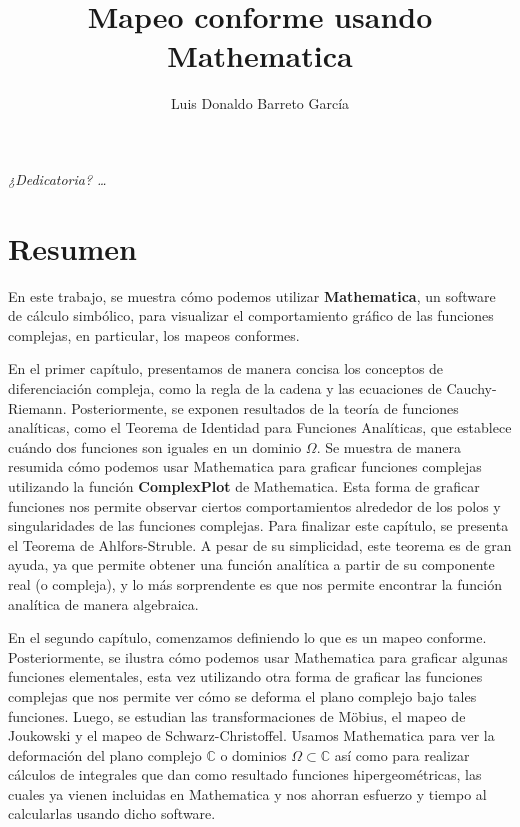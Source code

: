 \documentclass[letterpaper,12pt,openany]{book}
\author{Luis Donaldo Barreto García}
\title{Mapeo conforme usando Mathematica}
\theoremstyle{definition}
\theoremstyle{definition}
\theoremstyle{definition}
\theoremstyle{definition}
\theoremstyle{definition}
\theoremstyle{remark}
\theoremstyle{definition}
\newcommand{\C}{\mathbb{C}}
\begin{document}
	
	\maketitle  
	
	\thispagestyle{empty} 
	
	\frontmatter
	
	\chapter*{}
	\begin{flushright}%
		\emph{¿Dedicatoria? \ldots}
		\thispagestyle{empty}
	\end{flushright}
	
	\chapter*{Resumen}
	En este trabajo, se muestra cómo podemos utilizar \textbf{Mathematica}, un software de cálculo simbólico, para visualizar el comportamiento gráfico de las funciones complejas, en particular, los mapeos conformes.
	
	En el primer capítulo, presentamos de manera concisa los conceptos de diferenciación compleja, como la regla de la cadena y las ecuaciones de Cauchy-Riemann. Posteriormente, se exponen resultados de la teoría de funciones analíticas, como el Teorema de Identidad para Funciones Analíticas, que establece cuándo dos funciones son iguales en un dominio $\Omega$. Se muestra de manera resumida cómo podemos usar Mathematica para graficar funciones complejas utilizando la función \textbf{ComplexPlot} de Mathematica. Esta forma de graficar funciones nos permite observar ciertos comportamientos alrededor de los polos y singularidades de las funciones complejas. Para finalizar este capítulo, se presenta el Teorema de Ahlfors-Struble. A pesar de su simplicidad, este teorema es de gran ayuda, ya que permite obtener una función analítica a partir de su componente real (o compleja), y lo más sorprendente es que nos permite encontrar la función analítica de manera algebraica.
	
	En el segundo capítulo, comenzamos definiendo lo que es un mapeo conforme. Posteriormente, se ilustra cómo podemos usar Mathematica para graficar algunas funciones elementales, esta vez utilizando otra forma de graficar las funciones complejas que nos permite ver cómo se deforma el plano complejo bajo tales funciones. Luego, se estudian las transformaciones de Möbius, el mapeo de Joukowski y el mapeo de Schwarz-Christoffel. Usamos Mathematica para ver la deformación del plano complejo $\C$ o dominios $\Omega\subset\C$ así como para realizar cálculos de integrales que dan como resultado funciones hipergeométricas, las cuales ya vienen incluidas en Mathematica y nos ahorran esfuerzo y tiempo al calcularlas usando dicho software.
	
\end{document}
